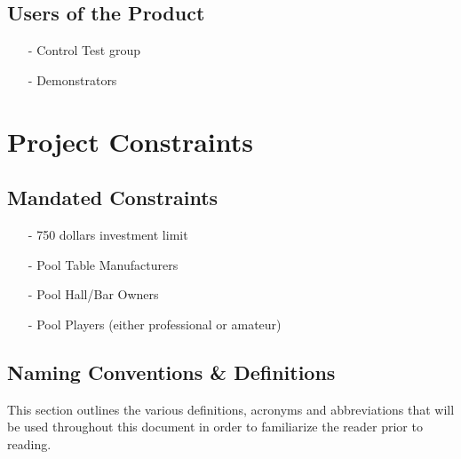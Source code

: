 \documentclass[titlepage]{article}
\begin{document}
\subsection{Users of the Product}
\begin{itemize}
\item[-]  Control Test group
\item[-]  Demonstrators
\end{itemize}


\section{Project Constraints}
\subsection{Mandated Constraints}
\begin{itemize}
\item[-] 750 dollars investment limit
\item[-]  Pool Table Manufacturers 
\item[-]  Pool Hall/Bar Owners
\item[-]  Pool Players (either professional or amateur)
\end{itemize}

\subsection{Naming Conventions \& Definitions}
This section outlines the various definitions, acronyms and abbreviations that will be used throughout this document in order to familiarize the reader prior to reading.
\end{document}
